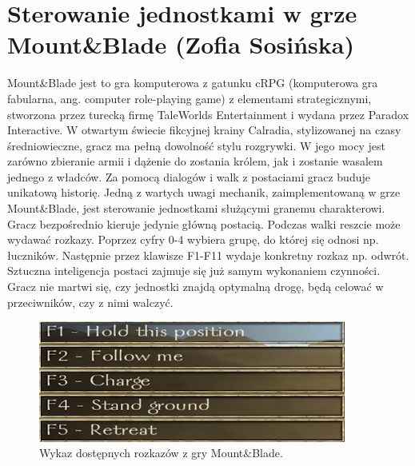 \section{Sterowanie jednostkami w grze Mount\&Blade (Zofia Sosińska)}\label{chap:mb}

Mount\&Blade jest to gra komputerowa z gatunku cRPG (komputerowa gra fabularna, ang. computer role-playing game) z elementami strategicznymi,
stworzona przez turecką firmę TaleWorlds Entertainment i wydana przez Paradox Interactive. W otwartym świecie fikcyjnej krainy Calradia, stylizowanej
na czasy średniowieczne, gracz ma pełną dowolność stylu rozgrywki. W jego mocy jest zarówno zbieranie armii i dążenie do zostania królem, jak i zostanie
wasalem jednego z władców. Za pomocą dialogów i walk z postaciami gracz buduje unikatową historię.
Jedną z wartych uwagi mechanik, zaimplementowaną w grze Mount\&Blade, jest sterowanie jednostkami służącymi granemu charakterowi. Gracz bezpośrednio
kieruje jedynie główną postacią. Podczas walki reszcie może wydawać rozkazy. Poprzez cyfry 0-4 wybiera grupę, do której się odnosi np. łuczników. Następnie
przez klawisze F1-F11 wydaje konkretny rozkaz np. odwrót. Sztuczna inteligencja postaci zajmuje się już samym wykonaniem czynności. Gracz nie martwi się,
czy jednostki znajdą optymalną drogę, będą celować w przeciwników, czy z nimi walczyć.


\begin{figure}[h!tbp]
    \centering
    \includegraphics[width=0.9\textwidth]{images/ui/commandsMountBla.png}
    \caption{Wykaz dostępnych rozkazów z gry Mount\&Blade.}\label{fig:MountnBlade}
    \label{fig:mnb}
\end{figure}
